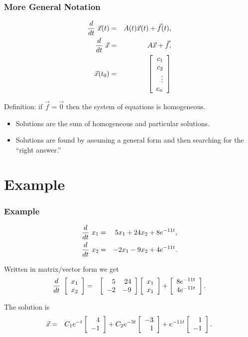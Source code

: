 \begin{frame}
  \frametitle{More General Notation}

  \begin{eqnarray*}
    \deriv{~}{t} \vec{x}(t) & = & A(t) \vec{x}(t) + \vec{f}(t), \\
    \deriv{~}{t} \vec{x} & = & A \vec{x} + \vec{f}, \\
    \vec{x}(t_0) & = & 
    \left[
      \begin{array}{r}
        c_1 \\ c_2 \\ \vdots \\ c_n
      \end{array}
    \right]
  \end{eqnarray*}

  Definition: if $\vec{f}=\vec{0}$ then the system of equations is
  homogeneous.

  \begin{itemize}
  \item Solutions are the sum of homogeneous and particular solutions.
  \item Solutions are found by assuming a general form and then
    searching for the ``right answer.''
  \end{itemize}

\end{frame}

\section{Example}

\begin{frame}
  \frametitle{Example}

  \begin{eqnarray*}
    \deriv{~}{t} x_1 & = & 5  x_1 + 24 x_2 + 8 e^{-11t}, \\
    \deriv{~}{t} x_2 & = & -2 x_1 -  9 x_2 + 4 e^{-11t}.
  \end{eqnarray*}

  {
    Written in matrix/vector form we get
    \begin{eqnarray*}
      \deriv{~}{t} \vecTwo{x_1}{x_2} & = & 
      \arrayTwo{5}{24}{-2}{-9} \vecTwo{x_1}{x_1}
      + \vecTwo{8e^{-11t}}{4e^{-11t}}.
    \end{eqnarray*}
  }

  {
    The solution is
    \begin{eqnarray*}
      \vec{x} & = & C_1 e^{-t} \vecTwo{4}{-1} 
      + C_2 e^{-3t} \vecTwo{-3}{1} + e^{-11t} \vecTwo{1}{-1}.
    \end{eqnarray*}
  }

\end{frame}


